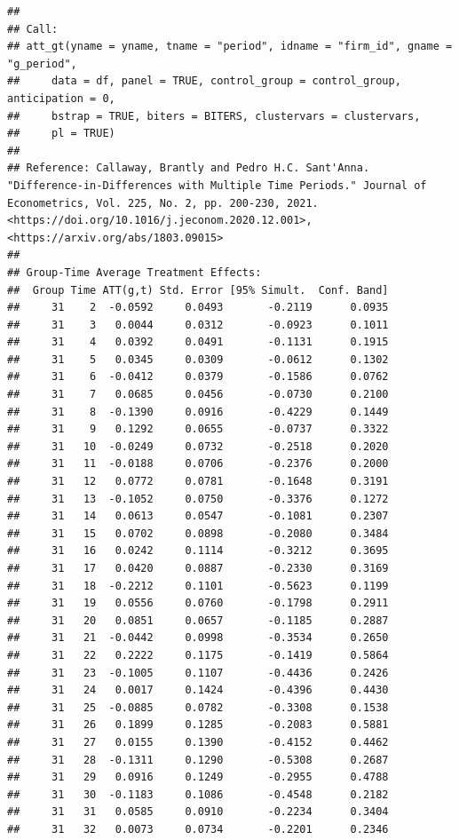 \documentclass[
]{article}
\begin{document}
\begin{verbatim}
## 
## Call:
## att_gt(yname = yname, tname = "period", idname = "firm_id", gname = "g_period", 
##     data = df, panel = TRUE, control_group = control_group, anticipation = 0, 
##     bstrap = TRUE, biters = BITERS, clustervars = clustervars, 
##     pl = TRUE)
## 
## Reference: Callaway, Brantly and Pedro H.C. Sant'Anna.  "Difference-in-Differences with Multiple Time Periods." Journal of Econometrics, Vol. 225, No. 2, pp. 200-230, 2021. <https://doi.org/10.1016/j.jeconom.2020.12.001>, <https://arxiv.org/abs/1803.09015> 
## 
## Group-Time Average Treatment Effects:
##  Group Time ATT(g,t) Std. Error [95% Simult.  Conf. Band]  
##     31    2  -0.0592     0.0493       -0.2119      0.0935  
##     31    3   0.0044     0.0312       -0.0923      0.1011  
##     31    4   0.0392     0.0491       -0.1131      0.1915  
##     31    5   0.0345     0.0309       -0.0612      0.1302  
##     31    6  -0.0412     0.0379       -0.1586      0.0762  
##     31    7   0.0685     0.0456       -0.0730      0.2100  
##     31    8  -0.1390     0.0916       -0.4229      0.1449  
##     31    9   0.1292     0.0655       -0.0737      0.3322  
##     31   10  -0.0249     0.0732       -0.2518      0.2020  
##     31   11  -0.0188     0.0706       -0.2376      0.2000  
##     31   12   0.0772     0.0781       -0.1648      0.3191  
##     31   13  -0.1052     0.0750       -0.3376      0.1272  
##     31   14   0.0613     0.0547       -0.1081      0.2307  
##     31   15   0.0702     0.0898       -0.2080      0.3484  
##     31   16   0.0242     0.1114       -0.3212      0.3695  
##     31   17   0.0420     0.0887       -0.2330      0.3169  
##     31   18  -0.2212     0.1101       -0.5623      0.1199  
##     31   19   0.0556     0.0760       -0.1798      0.2911  
##     31   20   0.0851     0.0657       -0.1185      0.2887  
##     31   21  -0.0442     0.0998       -0.3534      0.2650  
##     31   22   0.2222     0.1175       -0.1419      0.5864  
##     31   23  -0.1005     0.1107       -0.4436      0.2426  
##     31   24   0.0017     0.1424       -0.4396      0.4430  
##     31   25  -0.0885     0.0782       -0.3308      0.1538  
##     31   26   0.1899     0.1285       -0.2083      0.5881  
##     31   27   0.0155     0.1390       -0.4152      0.4462  
##     31   28  -0.1311     0.1290       -0.5308      0.2687  
##     31   29   0.0916     0.1249       -0.2955      0.4788  
##     31   30  -0.1183     0.1086       -0.4548      0.2182  
##     31   31   0.0585     0.0910       -0.2234      0.3404  
##     31   32   0.0073     0.0734       -0.2201      0.2346  

\end{verbatim}
\end{document}
